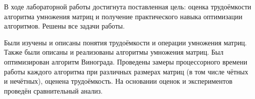 В ходе лабораторной работы достигнута поставленная цель: оценка трудоёмкости алгоритма умножения матриц и получение
практического навыка оптимизации алгоритмов. Решены все задачи работы.

Были изучены и описаны понятия трудоёмкости и операции умножения матриц. Также были описаны и реализованы алгоритмы умножения матриц. Был оптимизирован алгоритм Винограда. Проведены замеры процессорного времени работы каждого алгоритма при различных размерах матриц (в том числе чётных и нечётных), оценена трудоёмкость. На основании оценок и экспериментов проведён сравнительный анализ.